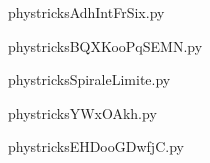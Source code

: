     

    \clearpage
    


    \newcommand{\CaptionFigAdhIntFrSix}{<+Type your caption here+>}
    \begin{center}
        
    \end{center}
    phystricksAdhIntFrSix.py

    

    \clearpage
    


    \newcommand{\CaptionFigBQXKooPqSEMN}{<+Type your caption here+>}
    \begin{center}
        
    \end{center}
    phystricksBQXKooPqSEMN.py

    

    \clearpage
    


    \newcommand{\CaptionFigSpiraleLimite}{<+Type your caption here+>}
    \begin{center}
        
    \end{center}
    phystricksSpiraleLimite.py

    

    \clearpage
    


    \newcommand{\CaptionFigYWxOAkh}{<+Type your caption here+>}
    \begin{center}
        
    \end{center}
    phystricksYWxOAkh.py

    

    \clearpage
    


    \newcommand{\CaptionFigEHDooGDwfjC}{<+Type your caption here+>}
    \begin{center}
        
    \end{center}
    phystricksEHDooGDwfjC.py

    

    \clearpage
    


